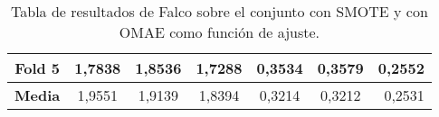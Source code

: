 \begin{table}[H]
{\begin{tabular}{|crrrrrr|}
\multicolumn{1}{|c|}{\textbf{Fold 5}} & \multicolumn{1}{c|}{1,7838}            & \multicolumn{1}{c|}{1,8536}              & \multicolumn{1}{c|}{\textbf{1,7288}} & \multicolumn{1}{c|}{0,3534}            & \multicolumn{1}{c|}{0,3579}              & 0,2552                             \\ \hline
\multicolumn{1}{|c|}{\textbf{Media}}  & \multicolumn{1}{c|}{1,9551}           & \multicolumn{1}{c|}{1,9139}             & \multicolumn{1}{c|}{1,8394}         & \multicolumn{1}{c|}{0,3214}            & \multicolumn{1}{c|}{0,3212}             & 0,2531                            \\ \hline
\end{tabular}%
}
\caption{Tabla de resultados de Falco sobre el conjunto con SMOTE y con OMAE como función de ajuste.}\label{tablaFALCOconSMOTEconOMAE}

\end{table}


